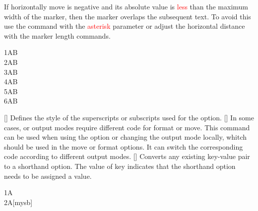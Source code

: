 \documentclass[load-preamble+]{cnltx-doc}
\renewcommand{\emph}[1]{\textcolor{red}{#1}}
\begin{document}
\begin{commands}
  If horizontally move is negative and its absolute value is \emph{less} than the maximum width of the marker, then the marker overlaps the subsequent text. To avoid this use the command with the \emph{asterisk} parameter or adjust the horizontal distance with the marker length commands.
\begin{demohigh}
1AB \\
2AB \\
3AB \\
4AB \\
5A\hspace{\dimexpr(\llastwd-8pt)}B \\
6A\hspace{\dimexpr(\maxwd-8pt)}B
\end{demohigh}
  []
  Defines the style of the superscripts or subscripts used for the  option.
  []
  In some cases,  or  output modes require different code for format or move. This command can be used when using the  option or changing the output mode locally, whitch should be used in the move or format options. It can switch the corresponding code according to different output modes.
  []
  Converts any existing key-value pair to a shorthand option. The value of key  indicates that the shorthand option needs to be assigned a value.
\begin{demohigh}
1A \\
2A[mysb]
\end{demohigh}
\end{commands}
\end{document}
